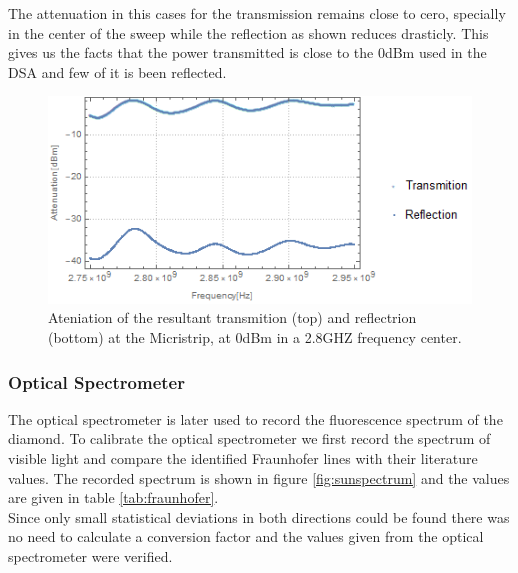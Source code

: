 The attenuation in this cases for the transmission remains close to cero, specially in the center of the sweep while the reflection as shown reduces drasticly. This gives  us the facts that the power transmitted is close to the 0dBm used in the DSA and few of it is been reflected.

\begin{figure}
	\centering
	\includegraphics[width=0.7\linewidth]{../figures/microstrip-trasm-eflect}
	\caption[trans-refl]{Ateniation of the resultant transmition (top) and reflectrion (bottom) at the Micristrip, at 0dBm in a 2.8GHZ frequency center.}
	\label{fig:microstrip-trasm-eflect}
\end{figure}

\subsubsection{Optical Spectrometer}
The optical spectrometer is later used to record the fluorescence spectrum of the diamond. To calibrate the optical spectrometer we first record the spectrum of visible light and compare the identified Fraunhofer lines with their literature values. The recorded spectrum is shown in figure \ref{fig:sunspectrum} and the values are given in table \ref{tab:fraunhofer}.\\

Since only small statistical deviations in both directions could be found there was no need to calculate a conversion factor and the values given from the optical spectrometer were verified. \\

